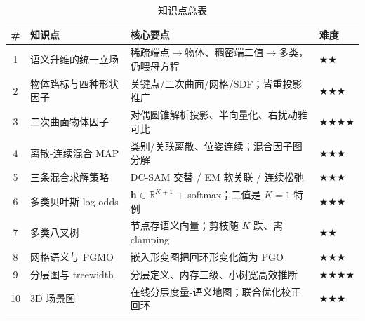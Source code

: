 \begin{table}[H]\centering\small
\caption{知识点总表}
\begin{tabular}{clll}
\toprule
\# & 知识点 & 核心要点 & 难度 \\
\midrule
1 & 语义升维的统一立场 & 稀疏端点$\to$物体、稠密端二值$\to$多类，仍喂母方程 & $\bigstar\bigstar$ \\
2 & 物体路标与四种形状因子 & 关键点/二次曲面/网格/SDF；皆重投影推广 & $\bigstar\bigstar\bigstar$ \\
3 & 二次曲面物体因子 & 对偶圆锥解析投影、半向量化、右扰动雅可比 & $\bigstar\bigstar\bigstar\bigstar$ \\
4 & 离散-连续混合 MAP & 类别/关联离散、位姿连续；混合因子图分解 & $\bigstar\bigstar\bigstar$ \\
5 & 三条混合求解策略 & DC-SAM 交替 / EM 软关联 / 连续松弛 & $\bigstar\bigstar\bigstar$ \\
6 & 多类贝叶斯 log-odds & $\mathbf{h}\in\mathbb{R}^{K+1}$ $+$ softmax；二值是 $K{=}1$ 特例 & $\bigstar\bigstar\bigstar$ \\
7 & 多类八叉树 & 节点存语义向量；剪枝随 $K$ 跌、需 clamping & $\bigstar\bigstar$ \\
8 & 网格语义与 PGMO & 嵌入形变图把回环形变化简为 PGO & $\bigstar\bigstar\bigstar$ \\
9 & 分层图与 treewidth & 分层定义、内存三级、小树宽高效推断 & $\bigstar\bigstar\bigstar\bigstar$ \\
10 & 3D 场景图 & 在线分层度量-语义地图；联合优化校正回环 & $\bigstar\bigstar\bigstar$ \\
\bottomrule
\end{tabular}
\end{table}

